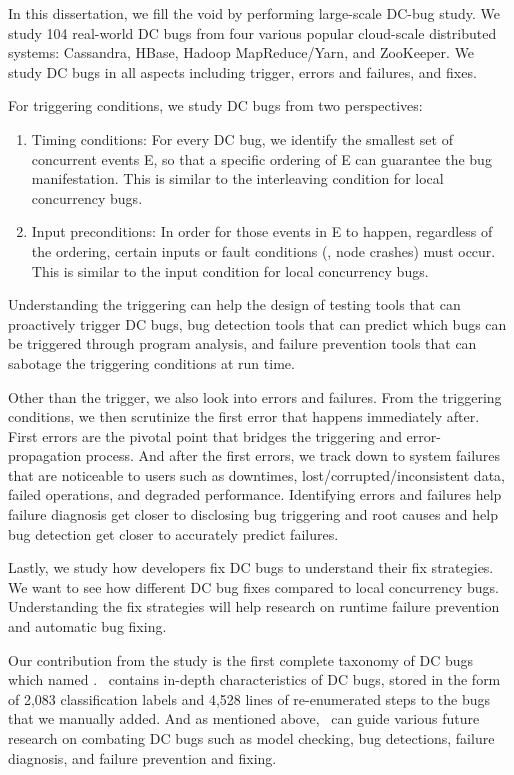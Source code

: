 In this dissertation, we fill the void by performing large-scale DC-bug study.
We study 104 real-world DC bugs from four various popular cloud-scale
distributed systems: Cassandra, HBase, Hadoop MapReduce/Yarn, and ZooKeeper. We
study DC bugs in all aspects including trigger, errors and failures, and fixes. 

For triggering conditions, we study DC bugs from two perspectives:
\begin{enumerate}

\item Timing conditions: For every DC bug, we identify the smallest set of
concurrent events E, so that a specific ordering of E can guarantee the bug
manifestation. This is similar to the interleaving condition for local
concurrency bugs.

\item Input preconditions: In order for those events in E to happen, regardless
of the ordering, certain inputs or fault conditions (\eg, node crashes) must
occur. This is similar to the input condition for local concurrency bugs.

\end{enumerate}
Understanding the triggering can help the design of testing tools that can
proactively trigger DC bugs, bug detection tools that can predict which bugs can
be triggered through program analysis, and failure prevention tools that can
sabotage the triggering conditions at run time.

Other than the trigger, we also look into errors and failures. From the
triggering conditions, we then scrutinize the first error that happens
immediately after. First errors are the pivotal point that bridges the
triggering and error-propagation process. 
%
And after the first errors, we track down to system failures that are noticeable
to users such as downtimes, lost/corrupted/inconsistent data, failed operations,
and degraded performance. Identifying errors and failures help failure diagnosis
get closer to disclosing bug triggering and root causes and help bug detection
get closer to accurately predict failures.

Lastly, we study how developers fix DC bugs to understand their fix strategies.
We want to see how different DC bug fixes compared to local concurrency bugs.
Understanding the fix strategies will help research on runtime failure
prevention and automatic bug fixing.

Our contribution from the study is the first complete taxonomy of DC bugs which
named \taxdc. \taxdc\ contains in-depth characteristics of DC bugs, stored in
the form of 2,083 classification labels and 4,528 lines of re-enumerated steps
to the bugs that we manually added. And as mentioned above, \taxdc\ can guide
various future research on combating DC bugs such as model checking, bug
detections, failure diagnosis, and failure prevention and fixing.


